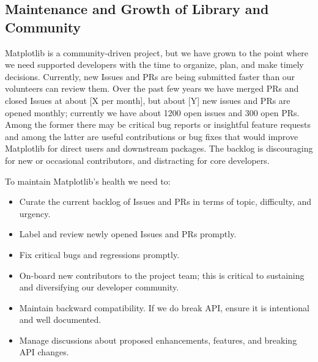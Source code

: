 \documentclass[11pt]{article}  %
\begin{document}
\subsection{Maintenance and Growth of Library and Community}


Matplotlib is a community-driven project, but we have grown to the
point where we need supported developers with the time to organize,
plan, and make timely decisions.  Currently, new Issues and PRs are
being submitted faster than our volunteers can review them.  Over the
past few years we have merged PRs and closed Issues at about [X per
  month], but about [Y] new issues and PRs are opened monthly;
currently we have about 1200 open issues and 300 open PRs.  Among the
former there may be critical bug reports or insightful feature
requests and among the latter are useful contributions or bug fixes
that would improve Matplotlib for direct users and downstream
packages.  The backlog is discouraging for new or occasional
contributors, and distracting for core developers.

To maintain Matplotlib's health we need to:

\begin{itemize}[noitemsep]
\item Curate the current backlog of Issues and PRs
  in terms of topic, difficulty, and urgency.
\item Label and review newly opened Issues and PRs
  promptly.
\item Fix critical bugs and regressions promptly.
\item On-board new contributors to the project team; this is critical to
  sustaining and diversifying our developer community.
\item Maintain backward compatibility.  If we do break API, ensure it
  is intentional and well documented.
\item Manage discussions about proposed enhancements, features, and
  breaking API changes.
\end{itemize}
\end{document}
